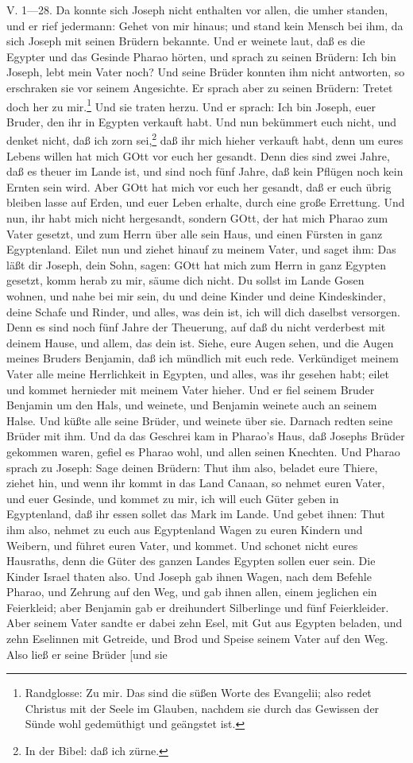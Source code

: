 V. 1—28. Da konnte sich Joseph nicht enthalten vor allen, die umher standen, und er rief jedermann: Gehet von mir hinaus; und stand kein Mensch bei ihm, da sich Joseph mit seinen Brüdern bekannte. Und er weinete laut, daß es die Egypter und das Gesinde Pharao hörten, und sprach zu seinen Brüdern: Ich bin Joseph, lebt mein Vater noch? Und seine Brüder konnten ihm nicht antworten, so erschraken sie vor seinem Angesichte. Er sprach aber zu seinen Brüdern: Tretet doch her zu mir.\footnote{Randglosse: Zu mir. Das sind die süßen Worte des Evangelii; also redet Christus mit der Seele im Glauben, nachdem sie durch das Gewissen der Sünde wohl gedemüthigt und geängstet ist.} Und sie traten herzu. Und er sprach: Ich bin Joseph, euer Bruder, den ihr in Egypten verkauft habt. Und nun bekümmert euch nicht, und denket nicht, daß ich zorn sei,\footnote{In der Bibel: daß ich zürne.} daß ihr mich hieher verkauft habt, denn um eures Lebens willen hat mich GOtt vor euch her gesandt. Denn dies sind zwei Jahre, daß es theuer im Lande ist, und sind noch fünf Jahre, daß kein Pflügen noch kein Ernten sein wird. Aber GOtt hat mich vor euch her gesandt, daß er euch übrig bleiben lasse auf Erden, und euer Leben erhalte, durch eine große Errettung. Und nun, ihr habt mich nicht hergesandt, sondern GOtt, der hat mich Pharao zum Vater gesetzt, und zum Herrn über alle sein Haus, und einen Fürsten in ganz Egyptenland. Eilet nun und ziehet hinauf zu meinem Vater, und saget ihm: Das läßt dir Joseph, dein Sohn, sagen: GOtt hat mich zum Herrn in ganz Egypten gesetzt, komm herab zu mir, säume dich nicht. Du sollst im Lande Gosen wohnen, und nahe bei mir sein, du und deine Kinder und deine Kindeskinder, deine Schafe und Rinder, und alles, was dein ist, ich will dich daselbst versorgen. Denn es sind noch fünf Jahre der Theuerung, auf daß du nicht verderbest mit deinem Hause, und allem, das dein ist. Siehe, eure Augen sehen, und die Augen meines Bruders Benjamin, daß ich mündlich mit euch rede. Verkündiget meinem Vater alle meine Herrlichkeit in Egypten, und alles, was ihr gesehen habt; eilet und kommet hernieder mit meinem Vater hieher. Und er fiel seinem Bruder Benjamin um den Hals, und weinete, und Benjamin weinete auch an seinem Halse. Und küßte alle seine Brüder, und weinete über sie. Darnach redten seine Brüder mit ihm. Und da das Geschrei kam in Pharao's Haus, daß Josephs Brüder gekommen waren, gefiel es Pharao wohl, und allen seinen Knechten. Und Pharao sprach zu Joseph: Sage deinen Brüdern: Thut ihm also, beladet eure Thiere, ziehet hin, und wenn ihr kommt in das Land Canaan, so nehmet euren Vater, und euer Gesinde, und kommet zu mir, ich will euch Güter geben in Egyptenland, daß ihr essen sollet das Mark im Lande. Und gebet ihnen: Thut ihm also, nehmet zu euch aus Egyptenland Wagen zu euren Kindern und Weibern, und führet euren Vater, und kommet. Und schonet nicht eures Hausraths, denn die Güter des ganzen Landes Egypten sollen euer sein. Die Kinder Israel thaten also. Und Joseph gab ihnen Wagen, nach dem Befehle Pharao, und Zehrung auf den Weg, und gab ihnen allen, einem jeglichen ein Feierkleid; aber Benjamin gab er dreihundert Silberlinge und fünf Feierkleider. Aber seinem Vater sandte er dabei zehn Esel, mit Gut aus Egypten beladen, und zehn Eselinnen mit Getreide, und Brod und Speise seinem Vater auf den Weg. Also ließ er seine Brüder [und sie
